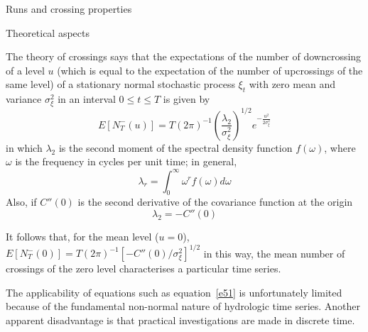 \documentclass[8pt]{beamer}
\renewcommand{\emph}[1]{\textcolor{myorange}{#1}}
\begin{document}
 \begin{frame}{Runs and crossing properties}
    \begin{block}{Theoretical aspects}
    \end{block}
The \emph{theory of crossings} says that the expectations of the number of \emph{downcrossing} of a level $u$ (which is equal to the expectation of the number  of upcrossings of the same level) of a \emph{stationary normal stochastic process} $\xi_t$ with zero mean and variance $\sigma_{\xi}^2$ in an interval $0 \leq t \leq T$ is given by
\begin{equation}
    E[N_{T}^- (u) ] = T(2\pi)^{-1} \left( \frac{\lambda_2}{\sigma_{\xi}^2} \right)^{1/2} e^{-\frac{u^2}{2\sigma_{\xi}^2}}
    \label{e51}
\end{equation}
in which $\lambda_2$ is the \emph{second moment} of the \emph{spectral density function} $f(\omega)$, where $\omega$ is the \emph{frequency} in cycles per unit time; in general,
\[
    \lambda_r = \int_0^\infty \omega^r f(\omega) d\omega
\]
Also, if $C''(0)$ is the \emph{second derivative} of the \emph{covariance function} at the origin 
\begin{equation}
    \lambda_2 = -C''(0)
    \label{e52}
\end{equation}
 
It follows  that, for the \emph{mean level} ($u=0$), $E[N_{T}^- (0)] = T(2\pi)^{-1} \left[ -C''(0)/\sigma_{\xi}^2 \right]^{1/2}$ in this way, the \emph{mean number of crossings} of the zero level characterises a particular time series.

The applicability of equations such as equation~\ref{e51} is unfortunately limited because of the fundamental \emph{non-normal} nature of \emph{hydrologic time series}. Another apparent disadvantage is that practical investigations are made in discrete  time.
\end{frame}
\end{document}
